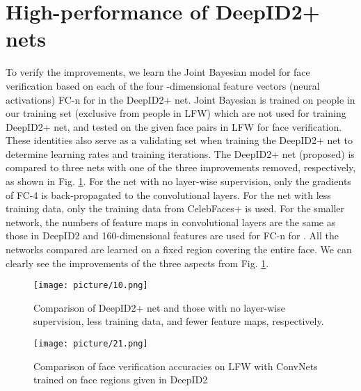 \documentclass[10pt,twocolumn,letterpaper]{article}
\begin{document}
\section{High-performance of DeepID2+ nets}
\label{sec:performance}

To verify the improvements, we learn the Joint Bayesian model \cite{chen2012} for face verification based on each of the four -dimensional feature vectors (neural activations) FC-n for  in the DeepID2+ net. Joint Bayesian is trained on  people in our training set (exclusive from people in LFW) which are not used for training DeepID2+ net, and tested on the  given face pairs in LFW for face verification. These  identities also serve as a validating set when training the DeepID2+ net to determine learning rates and training iterations. The DeepID2+ net (proposed) is compared to three nets with one of the three improvements removed, respectively, as shown in Fig. \ref{fig:self_comparison}. For the net with no layer-wise supervision, only the gradients of FC-4 is back-propagated to the convolutional layers. For the net with less training data, only the training data from CelebFaces+ is used. For the smaller network, the numbers of feature maps in  convolutional layers are the same as those in DeepID2 and 160-dimensional features are used for FC-n for . All the networks compared are learned on a fixed region covering the entire face. We can clearly see the improvements of the three aspects from Fig. \ref{fig:self_comparison}.

\begin{figure}[t]
\begin{center}
\texttt{[image: picture/10.png]}
\end{center}
\vspace{-0.15in}
\caption{Comparison of DeepID2+ net and those with no layer-wise supervision, less training data, and fewer feature maps, respectively.}
\label{fig:self_comparison}
\vspace{-0.1in}
\end{figure}

\begin{figure}[t]
\begin{center}
\texttt{[image: picture/21.png]}
\end{center}
\vspace{-0.15in}
\caption{Comparison of face verification accuracies on LFW with ConvNets trained on  face regions given in DeepID2 \cite{sun2014b}}
\label{fig:net25_noflip}
\vspace{-0.1in}
\end{figure}
\end{document}
